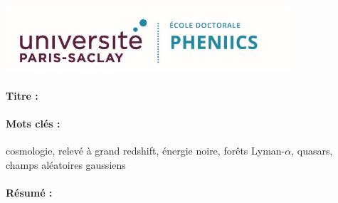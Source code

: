 \graphicspath{ {../figures/media/} }

\ifthispageodd{\newpage\thispagestyle{empty}\null\newpage}{}
\thispagestyle{empty}
\selectfont

\lhead{}
\rhead{}
\rfoot{}
\cfoot{}
\lfoot{}

\noindent 
\includegraphics[height=2.45cm]{ed/PHENIICS.jpeg}
\vspace{1cm}

\begin{mdframed}[linecolor=Prune,linewidth=1]
\vspace{-.25cm}
\paragraph*{Titre :} \PhDTitle{}

\begin{small}
\vspace{-.25cm}
\paragraph*{Mots clés :} cosmologie, relevé à grand redshift, énergie noire, forêts Lyman-$\alpha$, quasars, champs aléatoires gaussiens

\vspace{-.5cm}
\begin{multicols}{2}
\paragraph*{Résumé :} \lipsum[1-3]
\end{multicols}
\end{small}
\end{mdframed}

